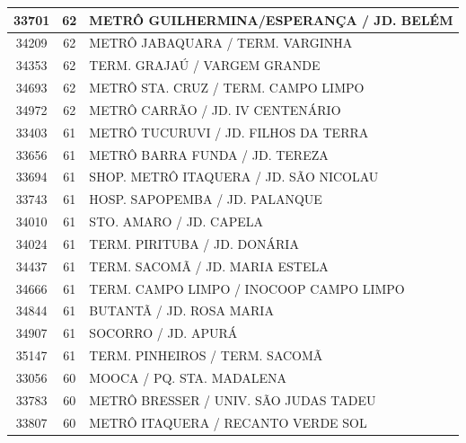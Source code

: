 \documentclass[
	12pt,				%
	oneside,			%
	a4paper,			%
	english,			%
	brazil				%
	]{abntex2ppgsi}
\begin{document}
{{\begin{apendicesenv}
\begin{longtable}{c|c|p{7cm}}
    33701 & 62    & METRÔ GUILHERMINA/ESPERANÇA / JD. BELÉM \\
\hline

    34209 & 62    & METRÔ JABAQUARA / TERM. VARGINHA \\
\hline

    34353 & 62    & TERM. GRAJAÚ / VARGEM GRANDE \\
\hline

    34693 & 62    & METRÔ STA. CRUZ / TERM. CAMPO LIMPO \\
\hline

    34972 & 62    & METRÔ CARRÃO / JD. IV CENTENÁRIO \\
\hline

    33403 & 61    & METRÔ TUCURUVI / JD. FILHOS DA TERRA \\
\hline

    33656 & 61    & METRÔ BARRA FUNDA / JD. TEREZA \\
\hline

    33694 & 61    & SHOP. METRÔ ITAQUERA / JD. SÃO NICOLAU \\
\hline

    33743 & 61    & HOSP. SAPOPEMBA / JD. PALANQUE \\
\hline

    34010 & 61    & STO. AMARO / JD. CAPELA \\
\hline

    34024 & 61    & TERM. PIRITUBA / JD. DONÁRIA \\
\hline

    34437 & 61    & TERM. SACOMÃ / JD. MARIA ESTELA \\
\hline

    34666 & 61    & TERM. CAMPO LIMPO / INOCOOP CAMPO LIMPO \\
\hline

    34844 & 61    & BUTANTÃ / JD. ROSA MARIA \\
\hline

    34907 & 61    & SOCORRO / JD. APURÁ \\
\hline

    35147 & 61    & TERM. PINHEIROS / TERM. SACOMÃ \\
\hline

    33056 & 60    & MOOCA / PQ. STA. MADALENA \\
\hline

    33783 & 60    & METRÔ BRESSER / UNIV. SÃO JUDAS TADEU \\
\hline

    33807 & 60    & METRÔ ITAQUERA / RECANTO VERDE SOL \\
\hline


\end{longtable}
\end{apendicesenv}}}
\end{document}
